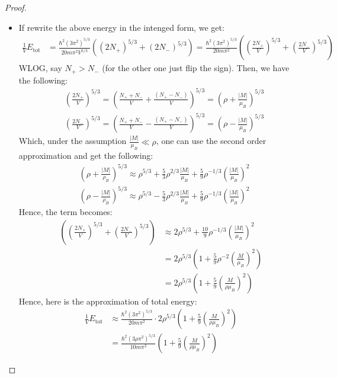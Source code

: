 \documentclass{article}
\begin{document}
\begin{proof}
\begin{itemize}
        \item[(b)] If rewrite the above energy in the intenged form, we get:
        \begin{align}
            \frac{1}{V}E_\text{tot} &= \frac{\hbar^2(3\pi^2)^{5/3}}{20m\pi^2 V^{5/3}}((2N_+)^{5/3}+(2N_-)^{5/3}) = \frac{\hbar^2(3\pi^2)^{5/3}}{20m\pi^2}\left(\left(\frac{2N_+}{V}\right)^{5/3}+\left(\frac{2N_-}{V}\right)^{5/3}\right)
        \end{align}
        WLOG, say $N_+>N_-$ (for the other one just flip the sign). Then, we have the following:
        \begin{align}
            &\left(\frac{2N_+}{V}\right)^{5/3} = \left(\frac{N_++N_-}{V} + \frac{(N_+-N_-)}{V}\right)^{5/3} = \left(\rho+\frac{|M|}{\mu_B}\right)^{5/3}\\
            &\left(\frac{2N_-}{V}\right)^{5/3} = \left(\frac{N_++N_-}{V} - \frac{(N_+-N_-)}{V}\right)^{5/3} = \left(\rho-\frac{|M|}{\mu_B}\right)^{5/3}
        \end{align}
        Which, under the assumption $\frac{|M|}{\mu_B}\ll \rho$, one can use the second order approximation and get the following:
        \begin{align}
            &\left(\rho+\frac{|M|}{\rho_B}\right)^{5/3} \approx \rho^{5/3}+\frac{5}{3}\rho^{2/3}\frac{|M|}{\mu_B} + \frac{5}{9}\rho^{-1/3}\left(\frac{|M|}{\mu_B}\right)^2\\
            &\left(\rho-\frac{|M|}{\rho_B}\right)^{5/3} \approx \rho^{5/3}-\frac{5}{3}\rho^{2/3}\frac{|M|}{\mu_B} + \frac{5}{9}\rho^{-1/3}\left(\frac{|M|}{\mu_B}\right)^2
        \end{align}
        Hence, the term becomes:
        \begin{align}
            \left(\left(\frac{2N_+}{V}\right)^{5/3}+\left(\frac{2N_-}{V}\right)^{5/3}\right)&\approx 2\rho^{5/3}+\frac{10}{9}\rho^{-1/3}\left(\frac{|M|}{\mu_B}\right)^2\\
            &= 2\rho^{5/3}\left(1+\frac{5}{9}\rho^{-2}\left(\frac{M}{\mu_B}\right)^2\right)\\
            &= 2\rho^{5/3}\left(1+\frac{5}{9}\left(\frac{M}{\rho\mu_B}\right)^2\right)
        \end{align}
        Hence, here is the approximation of total energy:
        \begin{align}
            \frac{1}{V}E_\text{tot} &\approx \frac{\hbar^2(3\pi^2)^{5/3}}{20m\pi^2}\cdot 2\rho^{5/3}\left(1+\frac{5}{9}\left(\frac{M}{\rho \mu_B}\right)^2\right)\\
            &= \frac{\hbar^2(3\rho \pi^2)^{5/3}}{10m\pi^2}\left(1+\frac{5}{9}\left(\frac{M}{\rho \mu_B}\right)^2\right)
        \end{align}
    \end{itemize}
\end{proof}
\end{document}
